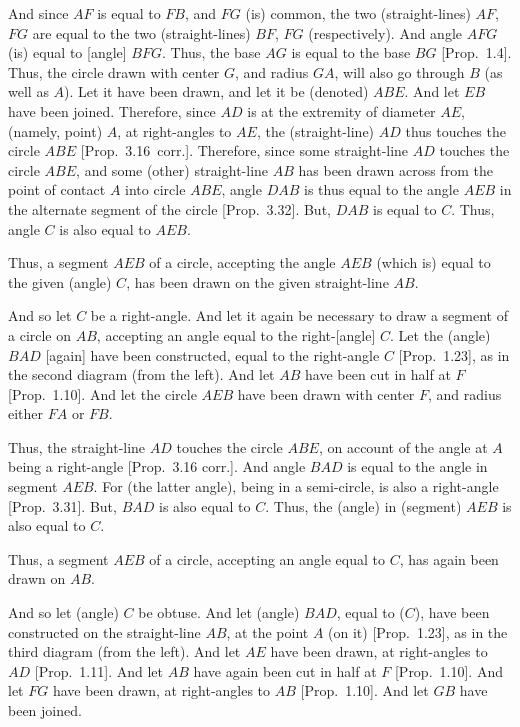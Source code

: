 And since $AF$ is equal to $FB$, and $FG$ (is) common, the two (straight-lines)
$AF$, $FG$ are equal to the two (straight-lines) $BF$, $FG$ (respectively). And
angle $AFG$ (is) equal to [angle] $BFG$. Thus, the base $AG$ is equal to the
base $BG$ [Prop.~1.4]. Thus, the circle drawn with center $G$, and radius $GA$, will also go through $B$ (as well as $A$). Let it have been drawn, and let it be (denoted) $ABE$. And let $EB$ have been joined. Therefore, since $AD$ is at the extremity
of diameter $AE$,  (namely, point) $A$,  at right-angles to $AE$, the (straight-line)
$AD$ thus touches the circle $ABE$ [Prop.~3.16~corr.]. Therefore,
since some straight-line $AD$ touches the circle $ABE$, and some (other)
straight-line $AB$ has been drawn across from the point of contact $A$ into circle
$ABE$, angle $DAB$ is thus equal to the angle $AEB$ in the alternate segment of the
circle [Prop.~3.32]. But, $DAB$ is equal to $C$. Thus,
angle $C$ is also equal to $AEB$.

Thus, a segment $AEB$ of a circle, accepting the angle $AEB$ (which is) equal to the
given (angle) $C$, has been drawn on the given straight-line $AB$.

And so let $C$ be a right-angle. And let it again be necessary to draw  a segment
of a circle on $AB$, accepting an angle equal to the right-[angle] $C$. Let the (angle)
$BAD$ [again] have been constructed, equal to the right-angle $C$ [Prop.~1.23], as in the second diagram (from the left). And let $AB$ have
been cut in half at $F$ [Prop.~1.10]. And let the circle $AEB$ have been
drawn with center $F$, and radius either  $FA$ or $FB$.

Thus, the straight-line $AD$ touches the circle $ABE$, on account of the angle at $A$ being a right-angle [Prop.~3.16 corr.]. And angle $BAD$ is equal
to the angle in segment $AEB$. For (the latter angle), being in a semi-circle, is also a right-angle [Prop.~3.31]. But,  $BAD$ is also equal to $C$. Thus, the (angle) in (segment) $AEB$ is also equal to $C$.

Thus, a segment $AEB$ of a circle, accepting an angle equal to $C$, has again been
drawn on $AB$.

And so let (angle) $C$ be obtuse. And let (angle) $BAD$, equal
to ($C$), have been constructed  on the straight-line $AB$, at the point $A$ 
(on it) [Prop.~1.23], as in the third diagram (from the left). And let $AE$ have been
drawn, at right-angles to $AD$ [Prop.~1.11]. And let $AB$ have again been
cut in half at $F$ [Prop.~1.10]. And let $FG$ have been drawn,
at right-angles to $AB$ [Prop.~1.10]. And let $GB$ 
have been joined.

